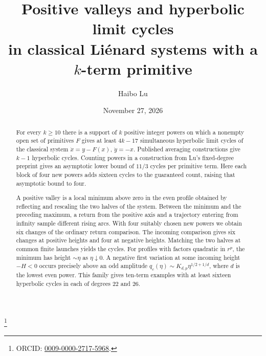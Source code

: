 
\title[Positive valleys in sparse classical Li\'enard systems]{Positive valleys and hyperbolic limit cycles\\
in classical Li\'enard systems with a $k$-term primitive}
\author{Haibo Lu}
\address{Shanghai Institute of Technology}
\date{November 27, 2026}
\thanks{ORCID: \href{https://orcid.org/0009-0000-2717-5968}{0009-0000-2717-5968}.}


\begin{abstract}
For every $k\ge10$ there is a support of $k$ positive integer powers
on which a nonempty open set of primitives $F$ gives at least $4k-17$
simultaneous hyperbolic limit cycles of the classical system
$\dot x=y-F(x)$, $\dot y=-x$. Published averaging constructions give
$k-1$ hyperbolic cycles. Counting powers in a construction from Lu's
fixed-degree preprint gives an asymptotic lower bound of $11/3$ cycles
per primitive term. Here each block of four new powers adds sixteen
cycles to the guaranteed count, raising that asymptotic bound to four.

A positive valley is a local minimum above zero in the even profile
obtained by reflecting and rescaling the two halves of the system.
Between the minimum and the preceding maximum, a return from the
positive axis and a trajectory entering from infinity sample different
rising arcs. With four suitably chosen new powers we obtain six changes
of the ordinary return comparison. The incoming comparison gives six
changes at positive heights and four at negative heights. Matching the
two halves at common finite launches yields the cycles. For profiles
with factors quadratic in $r^p$, the minimum has height $\sim\eta$ as
$\eta\downarrow0$. A negative first variation at some incoming height
$-H<0$ occurs precisely above an odd amplitude
$q_c(\eta)\sim K_{d,p}\eta^{1/2+1/d}$, where $d$ is the lowest even
power. This family gives ten-term examples with at least sixteen hyperbolic
cycles in each of degrees $22$ and $26$.
\end{abstract}
\maketitle

